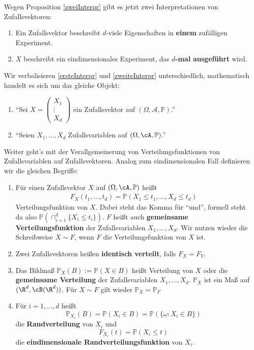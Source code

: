 \begin{disc}
	Wegen Proposition \ref{zweiInterpr} gibt es jetzt zwei Interpretationen von Zufallsvektoren:
	\begin{enumerate}[label=(\roman*)]
		\item\label{ersteInterpr} Ein Zufallsvektor beschreibt $d$-viele Eigenschaften in \textbf{einem} zuf\"alligen Experiment.
		\item\label{zweiteInterpr} $X$ beschreibt ein eindimensionales Experiment, das \textbf{$d$-mal ausgeführt} wird.
	\end{enumerate}
	Wir verbalisieren \ref{ersteInterpr} und \ref{zweiteInterpr} unterschiedlich, mathematisch handelt es sich um das gleiche Objekt:
	\begin{enumerate}[label=(\roman*)]
		\item \enquote{Sei $X = \left(\begin{array}{c} X_1\\\vdots\\ X_d\end{array}\right)$ ein Zufallsvektor auf $(\Omega, \mathcal A, \mathbb P)$.}
		\item \enquote{Seien $X_1,...,X_d$ Zufallsvariablen auf $(\Omega, \cA, \mathbb{P})$.}
	\end{enumerate}
\end{disc}
Weiter geht's mit der Verallgemeinerung von Verteilungsfunktionen von Zufallsvariablen auf Zufallsvektoren. Analog zum eindimensionalen Fall definieren wir die gleichen Begriffe:
\begin{deff}
	\begin{enumerate}[label=(\roman*)]
		\item Für einen Zufallsvektor $X$ auf $(\Omega, \cA, \mathbb{P})$ heißt
		\begin{align*}
			F_X(t_1,...,t_d) = \mathbb{P}(X_1 \leq t_1,...,X_d \leq t_d)
		\end{align*}	
		  Verteilungsfunktion von $X$. Dabei steht das Komma f\"ur \enquote{und}, formell steht da also $\mathbb P(\cap_{i=1}^d \{X_i\leq t_i\})$. $F$ heißt auch \textbf{gemeinsame Verteilungsfunktion} der Zufallsvariablen $X_1,...,X_d$. Wir nutzen wieder die Schreibweise $X\sim F$, wenn $F$ die Verteilungsfunktion von $X$ ist.
 		\item Zwei Zufallsvektoren heißen \textbf{identisch verteilt}, falls $F_X = F_Y$.
		\item Das Bildma\ss{} $\mathbb{P}_X(B) := \mathbb{P}(X \in B)$ heißt Verteilung von $X$ oder die  \textbf{gemeinsame Verteilung} der Zufallsvariablen $X_1,...,X_d$. $\mathbb{P}_X$ ist ein Maß auf $(\R^d, \cB(\R^d))$.
		Für $X \sim F$ gilt wieder $\mathbb{P}_X = \mathbb{P}_F$
		\item F\"ur $i=1,...,d$ hei\ss t $$\mathbb{P}_{X_i}(B) = \mathbb{P}(X_i \in B) = \mathbb{P}(\{ \omega \colon X_i \in B \})$$ die \textbf{Randverteilung} von $X_i$ und 	
		  \[ F_{X_i}(t) = \mathbb P(X_i\leq t)  \]
		die \textbf{eindimensionale Randverteilungsfunktion} von $X_i$.
	\end{enumerate}
\end{deff}
